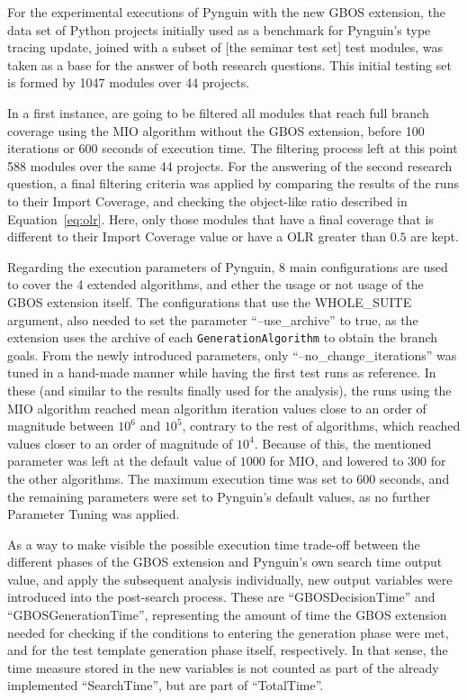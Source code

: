 \documentclass[%
  chapterprefix=false,%
  open=right,%
  twoside=true,%
  paper=a4,%
  logofile={Figures/logo.png},%
  thesistype=master,%
  UKenglish,%
]{se2thesis}
\newcommand{\classname}[1]{\texttt{#1}}
\begin{document}
For the experimental executions of Pynguin with the new GBOS extension, the data set of Python projects initially used as a benchmark for Pynguin's type tracing update, joined with a subset of [the seminar test set] test modules, was taken as a base for the answer of both research questions.
This initial testing set is formed by 1047 modules over 44 projects.

In a first instance, are going to be filtered all modules that reach full branch coverage using the MIO algorithm without the GBOS extension, before 100 iterations or 600 seconds of execution time.
The filtering process left at this point 588 modules over the same 44 projects.
For the answering of the second research question, a final filtering criteria was applied by comparing the  results of the runs to their Import Coverage, and checking the object-like ratio described in Equation~\ref{eq:olr}.
Here, only those modules that have a final coverage that is different to their Import Coverage value or have a OLR greater than \(0.5\) are kept.

Regarding the execution parameters of Pynguin, 8 main configurations are used to cover the 4 extended algorithms, and ether the usage or not usage of the GBOS extension itself.
The configurations that use the WHOLE\_SUITE argument, also needed to set the parameter ``--use\_archive'' to true, as the extension uses the archive of each \classname{GenerationAlgorithm} to obtain the branch goals.
From the newly introduced parameters, only ``--no\_change\_iterations'' was tuned in a hand-made manner while having the first test runs as reference.
In these (and similar to the results finally used for the analysis), the runs using the MIO algorithm reached mean algorithm iteration values close to an order of magnitude between \(10^6\) and \(10^5\), contrary to the rest of algorithms, which reached values closer to an order of magnitude of \(10^4\).
Because of this, the mentioned parameter was left at the default value of \(1000\) for MIO, and lowered to \(300\) for the other algorithms.
The maximum execution time was set to 600 seconds, and the remaining parameters were set to Pynguin's default values, as no further Parameter Tuning was applied.

As a way to make visible the possible execution time trade-off between the different phases of the GBOS extension and Pynguin's own search time output value, and apply the subsequent analysis individually, new output variables were introduced into the post-search process.
These are ``GBOSDecisionTime'' and ``GBOSGenerationTime'', representing the amount of time the GBOS extension needed for checking if the conditions to entering the generation phase were met, and for the test template generation phase itself, respectively.
In that sense, the time measure stored in the new variables is not counted as part of the already implemented ``SearchTime'', but are part of ``TotalTime''.
\end{document}
